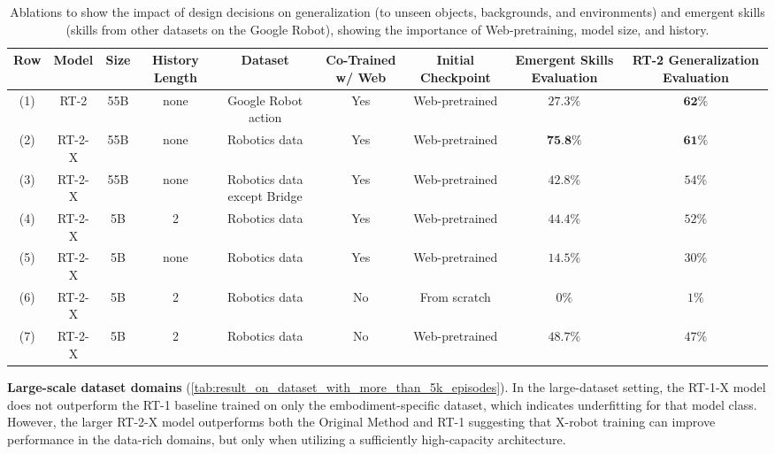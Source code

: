 \documentclass[letterpaper, 10 pt, conference]{ieeeconf}  %
\newcommand{\edrbot}{Google Robot\xspace}
\newcommand{\cro}{X}
\begin{document}
\begin{table}
        \centering
        \scriptsize
        \setlength{\tabcolsep}{3pt}
        \begin{tabular}{@{}ccccccccc@{}}
        \toprule
        Row & Model & Size & History Length & Dataset & Co-Trained w/ Web & Initial Checkpoint & Emergent Skills Evaluation & RT-2 Generalization Evaluation \\
        \midrule
        (1) & RT-2 & 55B & none & \edrbot action & Yes & Web-pretrained & $27.3\%$ & $\textbf{62\%}$ \\
        (2) & RT-2-X & 55B & none & Robotics data & Yes & Web-pretrained & $\textbf{75.8\%}$ & $\textbf{61\%}$ \\
 (3) & RT-2-X & 55B & none & Robotics data except Bridge & Yes & Web-pretrained & $42.8\%$ & $54\%$ \\
 (4) & RT-2-X & 5B & 2 & Robotics data & Yes  & Web-pretrained & $44.4\%$ & $52\%$ \\
 (5) & RT-2-X & 5B & none & Robotics data & Yes & Web-pretrained & $14.5\%$ & $30\%$ \\
 (6) & RT-2-X & 5B & 2 & Robotics data & No  & From scratch & $0\%$ & $1\%$ \\
(7) & RT-2-X & 5B & 2 & Robotics data & No  & Web-pretrained & $48.7\%$ & $47\%$ \\ 
        \bottomrule
        \end{tabular}
        \vspace{-0.5em}
        \caption{\small Ablations to show the impact of design decisions on generalization (to unseen objects, backgrounds, and environments) and emergent skills (skills from other datasets on the \edrbot), showing the importance of Web-pretraining, model size, and history.} 
        \label{tab:rt_2_x_generalization_and_ablation_results}
        \vspace{-3em}
\end{table}
\textbf{Large-scale dataset domains} (\cref{tab:result_on_dataset_with_more_than_5k_episodes}).
In the large-dataset setting, the RT-1-X model does not outperform the RT-1 baseline trained on only the embodiment-specific dataset, which indicates underfitting for that model class. 
However, the larger RT-2-X model outperforms both the Original Method and RT-1 suggesting that \cro-robot training can improve performance in the data-rich domains, but only when utilizing a sufficiently high-capacity architecture. 



\vspace{-0.2em}
\end{document}
